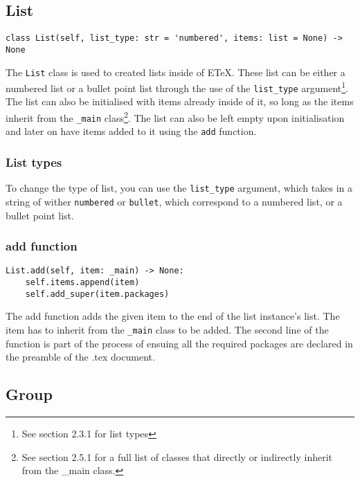 \documentclass{article}
\begin{document}
\subsection[List]{List}
\lstset{language=Python}
\begin{lstlisting}
class List(self, list_type: str = 'numbered', items: list = None) -> None
\end{lstlisting}
The \verb|List| class is used to created lists inside of ETeX. These list can be either a numbered list or a bullet point list through the use of the \verb|list_type| argument\footnote{See section 2.3.1 for list types}. The list can also be initialised with items already inside of it, so long as the items inherit from the \verb|_main| class\footnote{See section 2.5.1 for a full list of classes that directly or indirectly inherit from the \_main class.}. The list can also be left empty upon initialisation and later on have items added to it using the \verb|add| function.\subsubsection[List types]{List types}
To change the type of list, you can use the \verb|list_type| argument, which takes in a string of wither \verb|numbered| or \verb|bullet|, which correspond to a numbered list, or a bullet point list.\subsubsection[add function]{add function}
\lstset{language=Python}
\begin{lstlisting}
List.add(self, item: _main) -> None:
	self.items.append(item)
	self.add_super(item.packages)
\end{lstlisting}
The add function adds the given item to the end of the list instance's list. The item has to inherit from the \verb|_main| class to be added. The second line of the function is part of the process of ensuing all the required packages are declared in the preamble of the .tex document.\subsection[Group]{Group}
\end{document}
